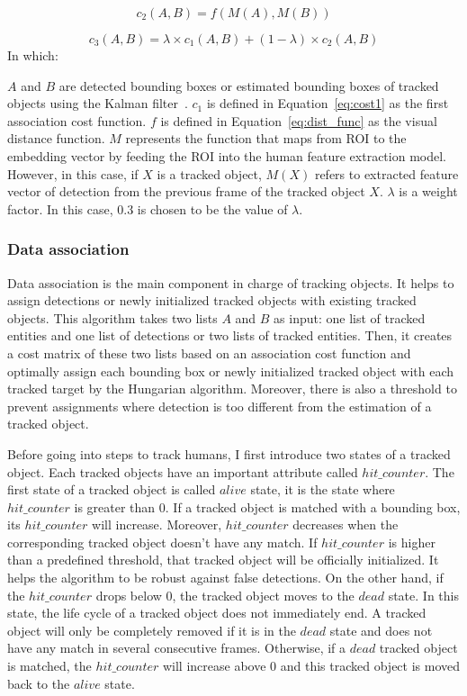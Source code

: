\documentclass[../main.tex]{subfiles}
\begin{document}
\begin{equation}\label{eq:cost2}
    c_{2}(A, B) = f(M(A), M(B))
\end{equation}

\begin{equation}\label{eq:cost3}
    c_{3}(A, B) = \lambda\times c_{1}(A, B) + (1-\lambda)\times c_{2}(A, B)
\end{equation}
In which:
\begin{outline}
 \1 $A$ and $B$ are detected bounding boxes or estimated bounding boxes of tracked objects using the Kalman filter~\cite{kalman}.
 \1 $c_{1}$ is defined in Equation~\ref{eq:cost1} as the first association cost function.
 \1 $f$ is defined in Equation~\ref{eq:dist_func} as the visual distance function.
 \1 $M$ represents the function that maps from ROI to the embedding vector by feeding the ROI into the human feature extraction model. However, in this case, if $X$ is a tracked object, $M(X)$ refers to extracted feature vector of detection from the previous frame of the tracked object $X$.
 \1 $\lambda$ is a weight factor. In this case, $0.3$ is chosen to be the value of $\lambda$.
\end{outline}

\subsubsection{Data association}
\label{subsec:dataasso}

Data association is the main component in charge of tracking objects. It helps to assign detections or newly initialized tracked objects with existing tracked objects. This algorithm takes two lists $A$ and $B$ as input: one list of tracked entities and one list of detections or two lists of tracked entities. Then, it creates a cost matrix of these two lists based on an association cost function and optimally assign each bounding box or newly initialized tracked object with each tracked target by the Hungarian algorithm. Moreover, there is also a threshold to prevent assignments where detection is too different from the estimation of a tracked object.

Before going into steps to track humans, I first introduce two states of a tracked object. Each tracked objects have an important attribute called $hit\_counter$. The first state of a tracked object is called $alive$ state, it is the state where $hit\_counter$ is greater than $0$. If a tracked object is matched with a bounding box, its $hit\_counter$ will increase. Moreover, $hit\_counter$ decreases when the corresponding tracked object doesn't have any match. If $hit\_counter$ is higher than a predefined threshold, that tracked object will be officially initialized. It helps the algorithm to be robust against false detections. On the other hand, if the $hit\_counter$ drops below $0$, the tracked object moves to the $dead$ state. In this state, the life cycle of a tracked object does not immediately end. A tracked object will only be completely removed if it is in the $dead$ state and does not have any match in several consecutive frames. Otherwise, if a $dead$ tracked object is matched, the $hit\_counter$ will increase above $0$ and this tracked object is moved back to the $alive$ state.
\end{document}
